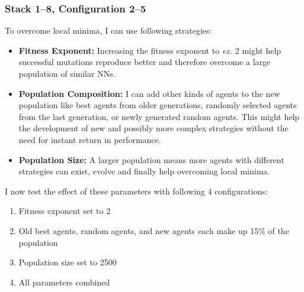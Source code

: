 \documentclass[11pt]{report}
\begin{document}
\begin{enumerate}
    \subsubsection{Stack 1--8, Configuration 2--5}
    To overcome local minima, I can use following strategies:
    \begin{itemize}
        \item \textbf{Fitness Exponent:} Increasing the fitness exponent to \textit{ex.} 2 might help successful mutations reproduce better and therefore overcome a large population of similar NNs.
        \item \textbf{Population Composition:} I can add other kinds of agents to the new population like best agents from older generations, randomly selected agents from the last generation, or newly generated random agents.
        This might help the development of new and possibly more complex strategies without the need for instant return in performance.
        \item \textbf{Population Size:} A larger population means more agents with different strategies can exist, evolve and finally help overcoming local minima.
    \end{itemize}
    I now test the effect of these parameters with following 4 configurations:
    \begin{enumerate}
        \item Fitness exponent set to 2
        \item Old best agents, random agents, and new agents each make up 15\% of the population
        \item Population size set to 2500
        \item All parameters combined
    \end{enumerate}
    \begin{figure}[H]


\end{figure}
\end{enumerate}
\end{document}
